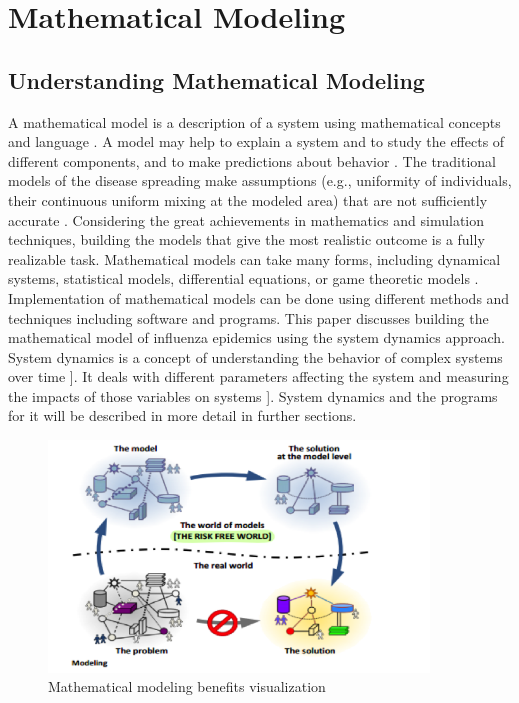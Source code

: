 \chapter{Mathematical Modeling}


\section{Understanding Mathematical Modeling}

A mathematical model is a description of a system using mathematical concepts and language \cite{per5}. A model may help to explain a system and to study the effects of different components, and to make predictions about behavior \cite{per6}. The traditional models of the disease spreading make assumptions (e.g., uniformity of individuals, their continuous uniform mixing at the modeled area) that are not sufficiently accurate \cite{per7}. Considering the great achievements in mathematics and simulation techniques, building the models that give the most realistic outcome is a fully realizable task. Mathematical models can take many forms, including dynamical systems, statistical models, differential equations, or game theoretic models \cite{per7}. Implementation of mathematical models can be done using different methods and techniques including software and programs. This paper discusses building the mathematical model of influenza epidemics using the system dynamics approach. System dynamics is a concept of understanding the behavior of complex systems over time \cite{per1}]. It deals with different parameters affecting the system and measuring the impacts of those variables on systems \cite{per1}]. System dynamics and the programs for it will be described in more detail in further sections.

\begin{figure}
   \centering
	\includegraphics[width=0.9\textwidth]{img/modeling}
	\caption[Clear]{Mathematical modeling benefits visualization}
\end{figure}


